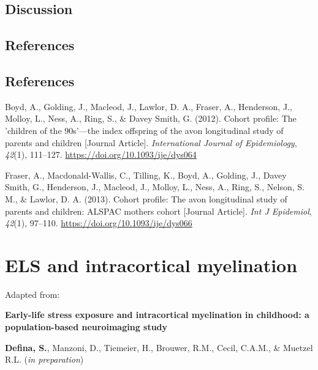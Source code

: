 \documentclass[
  letterpaper,
  DIV=11,
  numbers=noendperiod]{scrreport}
\newlength{\cslhangindent}
\newenvironment{CSLReferences}[2] %
 {\begin{list}{}{%
  \setlength{\itemindent}{0pt}
  \setlength{\leftmargin}{0pt}
  \setlength{\parsep}{0pt}
  \ifodd #1
   \setlength{\leftmargin}{\cslhangindent}
   \setlength{\itemindent}{-1\cslhangindent}
  \fi
  \setlength{\itemsep}{#2\baselineskip}}}
 {\end{list}}
\begin{document}
\section{Discussion}\label{discussion-1}

\section*{References}\label{references-2}


\section*{References}\label{bibliography--3}

\label{refs--3}
\begin{CSLReferences}{1}{0}
Boyd, A., Golding, J., Macleod, J., Lawlor, D. A., Fraser, A.,
Henderson, J., Molloy, L., Ness, A., Ring, S., \& Davey Smith, G.
(2012). Cohort profile: The 'children of the 90s'---the index offspring
of the avon longitudinal study of parents and children {[}Journal
Article{]}. \emph{International Journal of Epidemiology}, \emph{42}(1),
111--127. \url{https://doi.org/10.1093/ije/dys064}

Fraser, A., Macdonald-Wallis, C., Tilling, K., Boyd, A., Golding, J.,
Davey Smith, G., Henderson, J., Macleod, J., Molloy, L., Ness, A., Ring,
S., Nelson, S. M., \& Lawlor, D. A. (2013). Cohort profile: The avon
longitudinal study of parents and children: ALSPAC mothers cohort
{[}Journal Article{]}. \emph{Int J Epidemiol}, \emph{42}(1), 97--110.
\url{https://doi.org/10.1093/ije/dys066}

\end{CSLReferences}

\chapter{ELS and intracortical myelination}\label{sec-chapter4}

Adapted from:

\textbf{Early-life stress exposure and intracortical myelination in
childhood: a population-based neuroimaging study}

\textbf{Defina, S.}, Manzoni, D., Tiemeier, H., Brouwer, R.M., Cecil,
C.A.M., \& Muetzel R.L. (\emph{in preparation})
\end{document}
